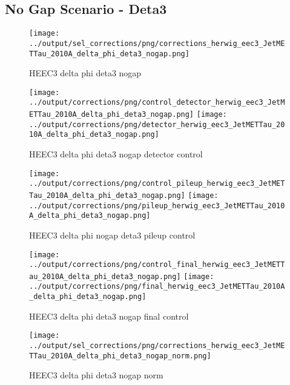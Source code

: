 \documentclass[11pt]{book}
\begin{document}
\clearpage
\subsection{No Gap Scenario - Deta3}
\begin{figure}[ht]
\centering
\texttt{[image: ../output/sel\_corrections/png/corrections\_herwig\_eec3\_JetMETTau\_2010A\_delta\_phi\_deta3\_nogap.png]}
\caption{HEEC3 delta phi deta3 nogap}
\label{fig:HEEC3_JetMETTau_2010A_delta_phi_deta3_nogap}
\end{figure}

\begin{figure}[ht]
\centering
\texttt{[image: ../output/corrections/png/control\_detector\_herwig\_eec3\_JetMETTau\_2010A\_delta\_phi\_deta3\_nogap.png]}
\texttt{[image: ../output/corrections/png/detector\_herwig\_eec3\_JetMETTau\_2010A\_delta\_phi\_deta3\_nogap.png]}
\caption{HEEC3 delta phi deta3 nogap detector control}
\label{fig:HEEC3_JetMETTau_2010A_delta_phi_deta3_nogap_detector_control}
\end{figure}

\begin{figure}[ht]
\centering
\texttt{[image: ../output/corrections/png/control\_pileup\_herwig\_eec3\_JetMETTau\_2010A\_delta\_phi\_deta3\_nogap.png]}
\texttt{[image: ../output/corrections/png/pileup\_herwig\_eec3\_JetMETTau\_2010A\_delta\_phi\_deta3\_nogap.png]}
\caption{HEEC3 delta phi nogap deta3 pileup control}
\label{fig:HEEC3_JetMETTau_2010A_delta_phi_deta3_nogap_pileup_control}
\end{figure}


\begin{figure}[ht]
\centering
\texttt{[image: ../output/corrections/png/control\_final\_herwig\_eec3\_JetMETTau\_2010A\_delta\_phi\_deta3\_nogap.png]}
\texttt{[image: ../output/corrections/png/final\_herwig\_eec3\_JetMETTau\_2010A\_delta\_phi\_deta3\_nogap.png]}
\caption{HEEC3 delta phi deta3 nogap final control}
\label{fig:HEEC3_JetMETTau_2010A_delta_phi_deta3_nogap_final_control}
\end{figure}

\begin{figure}[ht]
\centering
\texttt{[image: ../output/sel\_corrections/png/corrections\_herwig\_eec3\_JetMETTau\_2010A\_delta\_phi\_deta3\_nogap\_norm.png]}
\caption{HEEC3 delta phi deta3 nogap norm}
\label{fig:HEEC3_JetMETTau_2010A_delta_phi_deta3_nogap_norm}
\end{figure}
\end{document}
